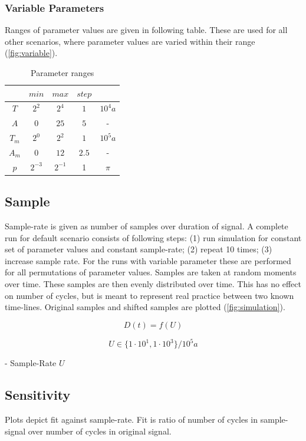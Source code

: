 \documentclass[12pt]{article}
\begin{document}
\subsubsection*{Variable Parameters}

Ranges of parameter values are given in following table. These are used for all other scenarios, where parameter values are varied within their range (\autoref{fig:variable}).

\begin{table}
\centering
\caption{Parameter ranges}
\label{tab:range}
\begin{tabular}{c|c|c|c|c}
& $min$ & $max$ & $step$ & \\
\hline
$T$ & $2^2$ & $2^4$ & $1$ & $10^4a$ \\
$A$ & $0$ & $25$ & $5$ & - \\
$T_m$ & $2^0$ & $2^2$ & $1$ & $10^5a$ \\
$A_m$ & $0$ & $12$ & $2.5$ & - \\
$p$ & $2^{-3}$ & $2^{-1}$ & 1 & $\pi$ \\
\end{tabular}
\end{table}

\subsection*{Sample}

Sample-rate is given as number of samples over duration of signal. A complete run for default scenario consists of following steps: (1) run simulation for constant set of parameter values and constant sample-rate; (2) repeat 10 times; (3) increase sample rate. For the runs with variable parameter these are performed for all permutations of parameter values. Samples are taken at random moments over time. These samples are then evenly distributed over time. This has no effect on number of cycles, but is meant to represent real practice between two known time-lines. Original samples and shifted samples are plotted (\autoref{fig:simulation}).

$$
D(t) = f(U)
$$

$$
U \in \{1 \cdot 10^1,1 \cdot 10^3\}/10^5a
$$

- Sample-Rate $U$

\subsection*{Sensitivity}

Plots depict fit against sample-rate. Fit is ratio of number of cycles in sample-signal over number of cycles in original signal.
\end{document}

